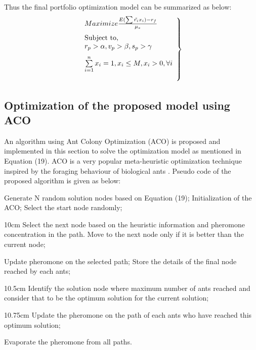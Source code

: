 \documentclass{elsarticle}
\begin{document}
Thus the final portfolio optimization model can be summarized as below:
\begin{equation}
\begin{aligned}
\left. \begin{array}{ll}
\vspace{0.25cm}
Maximize \frac{E(\sum \tilde{r_i}x_i)-r_f}{\mu_s}\\
\text{Subject to, }\\
\vspace{0.25cm}
r_p>\alpha, v_p>\beta, s_p>\gamma\\
\vspace{0.5cm}
\sum\limits_{i=1}^{n}x_i=1, x_i\leq M, x_i>0, \forall i
\end{array}\right\}
\end {aligned}
\end{equation}

\subsection{Optimization of the proposed model using ACO}
An algorithm using Ant Colony Optimization (ACO) is proposed and implemented in this section to solve the optimization model as mentioned in Equation (19). ACO is a very popular meta-heuristic optimization technique inspired by the foraging behaviour of biological ants \cite{Dorigo2006,Deneubourg1990}. Pseudo code of the proposed algorithm is given as below:

\begin{algorithm}
\caption{ACO algorithm for portfolio optimization}
\label{ACOportfolio}
\begin{algorithmic}[1]
\State Generate N random solution nodes based on Equation (19);
\State Initialization of the ACO;
\State Select the start node randomly;
\State \begin{varwidth}[t]{10cm}
Select the next node based on the heuristic information and pheromone concentration in the path. Move to the next node only if it is better than the current node;\\
\end{varwidth}
\State Update pheromone on the selected path;
\EndFor
\State Store the details of the final node reached by each ants;
\EndFor
\State 
\begin{varwidth}[t]{10.5cm}
Identify the solution node where maximum number of ants reached and consider that to be the optimum solution for the current solution;\\
\end{varwidth} 

\State 
\begin{varwidth}[t]{10.75cm}
Update the pheromone on the path of each ants who have reached this optimum solution;\\
\end{varwidth}
\State Evaporate the pheromone from all paths.
\EndFor

\EndProcedure
\end{algorithmic}
\end{algorithm}
\end{document}
